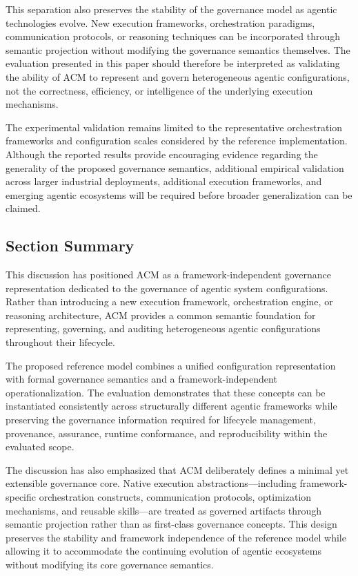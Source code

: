 \documentclass[10pt]{article}
\begin{document}
This separation also preserves the stability of the governance model as agentic technologies evolve. New execution frameworks, orchestration paradigms, communication protocols, or reasoning techniques can be incorporated through semantic projection without modifying the governance semantics themselves. The evaluation presented in this paper should therefore be interpreted as validating the ability of ACM to represent and govern heterogeneous agentic configurations, not the correctness, efficiency, or intelligence of the underlying execution mechanisms.

The experimental validation remains limited to the representative orchestration frameworks and configuration scales considered by the reference implementation. Although the reported results provide encouraging evidence regarding the generality of the proposed governance semantics, additional empirical validation across larger industrial deployments, additional execution frameworks, and emerging agentic ecosystems will be required before broader generalization can be claimed.

\subsection{Section Summary}

This discussion has positioned ACM as a framework-independent governance representation dedicated to the governance of agentic system configurations. Rather than introducing a new execution framework, orchestration engine, or reasoning architecture, ACM provides a common semantic foundation for representing, governing, and auditing heterogeneous agentic configurations throughout their lifecycle.

The proposed reference model combines a unified configuration representation with formal governance semantics and a framework-independent operationalization. The evaluation demonstrates that these concepts can be instantiated consistently across structurally different agentic frameworks while preserving the governance information required for lifecycle management, provenance, assurance, runtime conformance, and reproducibility within the evaluated scope.

The discussion has also emphasized that ACM deliberately defines a minimal yet extensible governance core. Native execution abstractions—including framework-specific orchestration constructs, communication protocols, optimization mechanisms, and reusable skills—are treated as governed artifacts through semantic projection rather than as first-class governance concepts. This design preserves the stability and framework independence of the reference model while allowing it to accommodate the continuing evolution of agentic ecosystems without modifying its core governance semantics.
\end{document}
